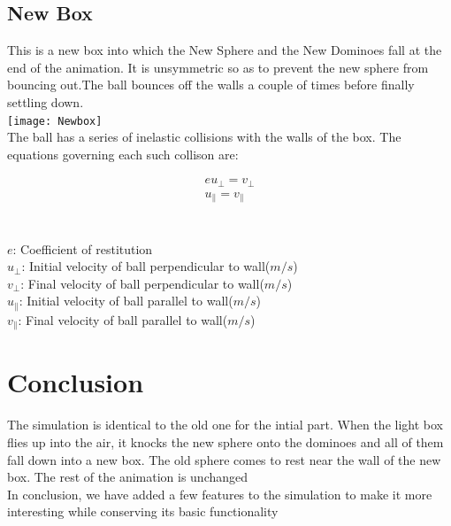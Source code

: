 \documentclass{article}
\begin{document}
\subsection{New Box}
This is a new box into which the New Sphere and the New Dominoes fall at the end of the animation. It is unsymmetric so as to prevent the new sphere from bouncing out.The ball bounces off the walls a couple of times before finally settling down.\\

\texttt{[image: Newbox]} \\

The ball has a series of inelastic collisions with the walls of the box. The equations governing each such collison are:

\begin{eqnarray}
eu_{\perp} = {v_{\perp}} \label {eq4:simp} \\
{u_{\parallel}} = {v_{\parallel}} \label {eq5:simp}
\end{eqnarray}
\\
\\
$e$: Coefficient of restitution \\ 
${u_{\perp}}$: Initial velocity of ball perpendicular to wall($m/s$) \\ 
${v_{\perp}}$: Final velocity of ball perpendicular to wall($m/s$) \\ 
${u_{\parallel}}$: Initial velocity of ball parallel to wall($m/s$) \\ 
$v_{\parallel}$: Final velocity of ball parallel to wall($m/s$) \\ 


\section{Conclusion}
The simulation is identical to the old one for the intial part. When the light box flies up into the air, it knocks the new sphere onto the dominoes and all of them fall down into a new box. The old sphere comes to rest near the wall of the new box. The rest of the animation is unchanged\\
In conclusion, we have added a few features to the simulation to make it more interesting while conserving its basic functionality \\


\end{document}
